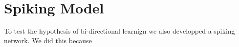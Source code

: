 \section{Spiking Model}

To test the hypothesis of bi-directional learnign we also developped a spiking network. We did this because